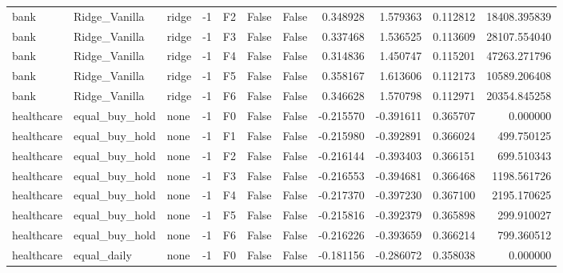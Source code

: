 \begin{tabular}{lllrlllrrrr}
      bank &                Ridge\_Vanilla &         ridge &    -1 &  F2 &           False &            False &  0.348928 &  1.579363 & 0.112812 &     18408.395839 \\
      bank &                Ridge\_Vanilla &         ridge &    -1 &  F3 &           False &            False &  0.337468 &  1.536525 & 0.113609 &     28107.554040 \\
      bank &                Ridge\_Vanilla &         ridge &    -1 &  F4 &           False &            False &  0.314836 &  1.450747 & 0.115201 &     47263.271796 \\
      bank &                Ridge\_Vanilla &         ridge &    -1 &  F5 &           False &            False &  0.358167 &  1.613606 & 0.112173 &     10589.206408 \\
      bank &                Ridge\_Vanilla &         ridge &    -1 &  F6 &           False &            False &  0.346628 &  1.570798 & 0.112971 &     20354.845258 \\
healthcare &               equal\_buy\_hold &          none &    -1 &  F0 &           False &            False & -0.215570 & -0.391611 & 0.365707 &         0.000000 \\
healthcare &               equal\_buy\_hold &          none &    -1 &  F1 &           False &            False & -0.215980 & -0.392891 & 0.366024 &       499.750125 \\
healthcare &               equal\_buy\_hold &          none &    -1 &  F2 &           False &            False & -0.216144 & -0.393403 & 0.366151 &       699.510343 \\
healthcare &               equal\_buy\_hold &          none &    -1 &  F3 &           False &            False & -0.216553 & -0.394681 & 0.366468 &      1198.561726 \\
healthcare &               equal\_buy\_hold &          none &    -1 &  F4 &           False &            False & -0.217370 & -0.397230 & 0.367100 &      2195.170625 \\
healthcare &               equal\_buy\_hold &          none &    -1 &  F5 &           False &            False & -0.215816 & -0.392379 & 0.365898 &       299.910027 \\
healthcare &               equal\_buy\_hold &          none &    -1 &  F6 &           False &            False & -0.216226 & -0.393659 & 0.366214 &       799.360512 \\
healthcare &                  equal\_daily &          none &    -1 &  F0 &           False &            False & -0.181156 & -0.286072 & 0.358038 &         0.000000 \\

\end{tabular}
